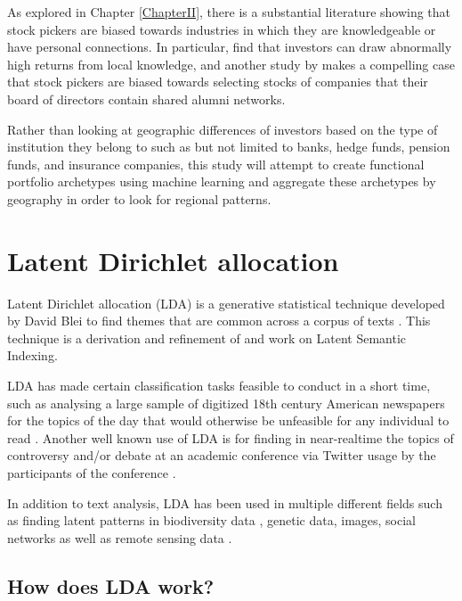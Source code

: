 As explored in Chapter \ref{ChapterII}, there is a substantial literature showing that stock pickers are biased towards industries in which they are knowledgeable or have personal connections.  In particular, \cite{covalthe2001} find that investors can draw abnormally high returns from local knowledge, and another study by \cite{Cohen2008} makes a compelling case that stock pickers are biased towards selecting stocks of companies that their board of directors contain shared alumni networks.  

Rather than looking at geographic differences of investors based on the type of institution they belong to such as but not limited to banks, hedge funds, pension funds, and insurance companies, this study will attempt to create functional portfolio archetypes using machine learning and aggregate these archetypes by geography in order to look for regional patterns.   

\section{Latent Dirichlet allocation}


Latent Dirichlet allocation (LDA)  is a generative statistical technique developed by David Blei to find themes that are common across a corpus of texts \citep{blei2003latent}.  This technique is a derivation and refinement of \cite{Papadimitriou98} and \cite{PAPADIMITRIOU2000217} work on Latent Semantic Indexing.  

LDA has made certain classification tasks feasible to conduct in a short time, such as analysing a large sample of digitized 18th century American newspapers for the topics of the day that would otherwise be unfeasible for any individual to read \citep{newman2006probabilistic}.  Another well known use of LDA is for finding in near-realtime the topics of controversy and/or debate at an academic conference via Twitter usage by the participants of the conference \citep{Marwick2013}.

In addition to text analysis, LDA has been used in multiple different fields such as finding latent patterns in biodiversity data \citep{Vale2014}, genetic data, images, social networks \citep{Blei2012} as well as remote sensing data \citep{Lienou2010}.

\subsection{How does LDA work?}


